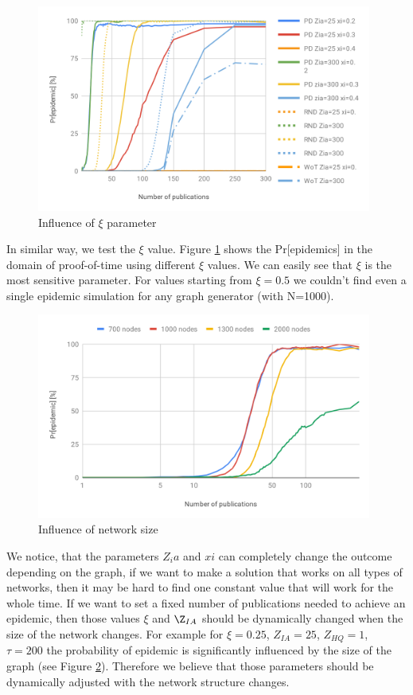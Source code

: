\documentclass[nostrict]{szablonPG}
\begin{document}
\begin{figure}[h!]
    \includegraphics[width=11cm]{img/influence-of-xi.png}
    \centering
    \caption{Influence of $\xi$ parameter}
    \label{fig:influence-of-xi}
\end{figure} 
In similar way, we test the $\xi$ value. Figure \ref{fig:influence-of-xi} shows the Pr[epidemics] in the domain of proof-of-time using different $\xi$ values. We can easily see that $\xi$ is the most sensitive parameter. For values starting from $\xi=0.5$ we couldn't find even a single epidemic simulation for any graph generator (with N=1000).

\begin{figure}[h!]
    \includegraphics[width=11cm]{img/Influence-of-network-size.png}
    \centering
    \caption{Influence of network size}
    \label{fig:influence-network-size}
\end{figure} 
We notice, that the parameters $Z_ia$ and $xi$ can completely change the outcome depending on the graph, if we want to make a solution that works on all types of networks, then it may be hard to find one constant value that will work for the whole time. If we want to set a fixed number of publications needed to achieve an epidemic, then those values $\xi$ and $\Z_{IA}$ should be dynamically changed when the size of the network changes.
For example for $\xi=0.25$, $Z_{IA}=25$, $Z_{HQ}=1$, $\tau=200$ the probability of epidemic is significantly influenced by the size of the graph (see Figure \ref{fig:influence-network-size}). Therefore we believe that those parameters should be dynamically adjusted with the network structure changes.
\end{document}
